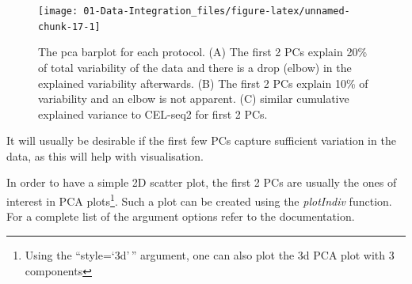 \documentclass[]{book}
\newenvironment{Shaded}{\begin{snugshade}}{\end{snugshade}}
\newcommand{\CommentTok}[1]{\textcolor[rgb]{0.56,0.35,0.01}{\textit{#1}}}
\newcommand{\DataTypeTok}[1]{\textcolor[rgb]{0.13,0.29,0.53}{#1}}
\newcommand{\DecValTok}[1]{\textcolor[rgb]{0.00,0.00,0.81}{#1}}
\newcommand{\FloatTok}[1]{\textcolor[rgb]{0.00,0.00,0.81}{#1}}
\newcommand{\KeywordTok}[1]{\textcolor[rgb]{0.13,0.29,0.53}{\textbf{#1}}}
\newcommand{\NormalTok}[1]{#1}
\newcommand{\OperatorTok}[1]{\textcolor[rgb]{0.81,0.36,0.00}{\textbf{#1}}}
\newcommand{\StringTok}[1]{\textcolor[rgb]{0.31,0.60,0.02}{#1}}
\let\rmarkdownfootnote\footnote%
\def\footnote{\protect\rmarkdownfootnote}
\theoremstyle{definition}
\theoremstyle{definition}
\theoremstyle{definition}
\theoremstyle{remark}
\begin{document}
\begin{Shaded}
\end{Shaded}

\begin{figure}[ht]

{\centering \texttt{[image: 01-Data-Integration\_files/figure-latex/unnamed-chunk-17-1]} 

}

\caption{The pca barplot for each protocol. (A) The first 2 PCs explain 20\% of total variability of the data and there is a drop (elbow) in the explained variability afterwards. (B) The first 2 PCs explain 10\% of variability and an elbow is not apparent. (C) similar cumulative explained variance to CEL-seq2 for first 2 PCs.}\label{fig:unnamed-chunk-17}
\end{figure}

It will usually be desirable if the first few PCs capture sufficient
variation in the data, as this will help with visualisation.

In order to have a simple 2D scatter plot, the first 2 PCs are usually
the ones of interest in PCA plots\footnote{Using the ``style=`3d'\,''
  argument, one can also plot the 3d PCA plot with 3 components}. Such a
plot can be created using the \emph{plotIndiv} function. For a complete
list of the argument options refer to the documentation.
\end{document}
